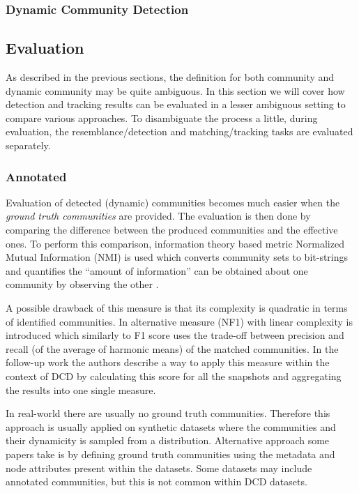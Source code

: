 \documentclass[
acmsmall,
nonacm,
screen,
acmthm]{../../scripts/pandoc/templates/acmart}
\begin{document}
\hypertarget{dynamic-community-detection-1}{%
\subsubsection{Dynamic Community
Detection}\label{dynamic-community-detection-1}}

\hypertarget{evaluation}{%
\subsection{Evaluation}\label{evaluation}}

As described in the previous sections, the definition for both community
and dynamic community may be quite ambiguous. In this section we will
cover how detection and tracking results can be evaluated in a lesser
ambiguous setting to compare various approaches. To disambiguate the
process a little, during evaluation, the resemblance/detection and
matching/tracking tasks are evaluated separately.

\hypertarget{annotated}{%
\subsubsection{Annotated}\label{annotated}}

Evaluation of detected (dynamic) communities becomes much easier when
the \emph{ground truth communities} are provided. The evaluation is then
done by comparing the difference between the produced communities and
the effective ones. To perform this comparison, information theory based
metric Normalized Mutual Information (NMI) is used which converts
community sets to bit-strings and quantifies the ``amount of
information'' can be obtained about one community by observing the other
\citep{lancichinettiDetectingOverlappingHierarchical2009}.

A possible drawback of this measure is that its complexity is quadratic
in terms of identified communities. In
\citep{rossettiNovelApproachEvaluate2016} alternative measure (NF1) with
linear complexity is introduced which similarly to F1 score uses the
trade-off between precision and recall (of the average of harmonic
means) of the matched communities. In the follow-up work
\citep{rossettiANGELEfficientEffective2020} the authors describe a way
to apply this measure within the context of DCD by calculating this
score for all the snapshots and aggregating the results into one single
measure.

In real-world there are usually no ground truth communities. Therefore
this approach is usually applied on synthetic datasets where the
communities and their dynamicity is sampled from a distribution.
Alternative approach some papers take is by defining ground truth
communities using the metadata and node attributes present within the
datasets. Some datasets may include annotated communities, but this is
not common within DCD datasets.
\end{document}
